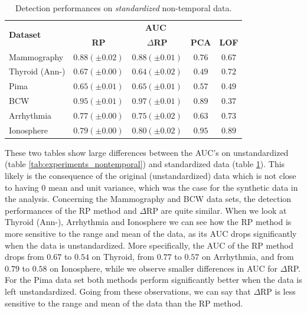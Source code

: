 \begin{table}[h]
	\centering
	\small
	\caption{Detection performances on \textit{standardized} non-temporal data.}
	\label{tab:experiments_stand_nontemporal}
	\begin{tabular}{l c c c c}
		\toprule	
		\multirow{2}{*}{\textbf{Dataset}} & \multicolumn{4}{c}{\textbf{AUC}} \\
		\cmidrule{2-5}
		& \textbf{RP} 			& \textbf{$\Delta$RP} 							&  \textbf{PCA}		& \textbf{LOF}	\\
		\midrule
		Mammography & $\mathbf{0.88 (\pm 0.02)}$& $\mathbf{0.88 (\pm 0.01)}$	& $0.76$			& $0.67$  	\\
		Thyroid (Ann-) & $0.67 (\pm 0.00)$ 		& $0.64 (\pm 0.02)$ 			& $0.49$			& $\mathbf{0.72}$	\\
		Pima 		& $\mathbf{0.65 (\pm 0.01)}$ & $\mathbf{0.65 (\pm 0.01)}$ 	& $0.57$			& $0.49$	\\	
		BCW  	& $0.95 (\pm 0.01)$& $\mathbf{0.97 (\pm 0.01)}$ 			& $0.89$			& $0.37$	\\
		Arrhythmia	& $\mathbf{0.77 (\pm 0.00)}$ 		& $0.75 (\pm 0.02)$  	& $0.63$			& $0.73$	\\
		Ionosphere	& $0.79 (\pm 0.00)$ 		& $0.80 (\pm 0.02)$  			& $\mathbf{0.95}$	& $0.89$	\\
		\bottomrule
	\end{tabular}
\end{table}

These two tables show large differences between the AUC's on unstandardized (table \ref{tab:experiments_nontemporal}) and standardized data (table \ref{tab:experiments_stand_nontemporal}). This likely is the consequence of the original (unstandardized) data which is not close to having $0$ mean and unit variance, which was the case for the synthetic data in the analysis. Concerning the Mammography and BCW data sets, the detection performances of the RP method and $\Delta$RP are quite similar. When we look at Thyroid (Ann-), Arrhythmia and Ionosphere we can see how the RP method is more sensitive to the range and mean of the data, as its AUC drops significantly when the data is unstandardized. More specifically, the AUC of the RP method drops from $0.67$ to $0.54$ on Thyroid, from $0.77$ to $0.57$ on Arrhythmia, and from $0.79$ to $0.58$ on Ionosphere, while we observe smaller differences in AUC for $\Delta$RP. For the Pima data set both methods perform significantly better when the data is left unstandardized. Going from these observations, we can say that $\Delta$RP is less sensitive to the range and mean of the data than the RP method. 
